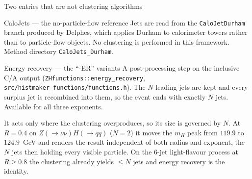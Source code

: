 \documentclass[aspectratio=169,10pt]{beamer}
\newcommand{\Ccalo}[1]{\textcolor{calogreen}{#1}}
\begin{document}
\begin{frame}{Two entries that are not clustering algorithms}

  \begin{block}{CaloJets --- the no-particle-flow reference}
    Jets are read from the \texttt{CaloJetDurham} branch produced by Delphes,
    which applies Durham to calorimeter towers rather than to particle-flow
    objects. No clustering is performed in this framework. Method directory
    \Ccalo{\texttt{CaloJets\_Durham}}.
  \end{block}

  \begin{block}{Energy recovery --- the ``-ER'' variants}
    A post-processing step on the inclusive C/A output
    (\texttt{ZHfunctions::energy\_recovery},
    \texttt{src/histmaker\_functions/functions.h}). The $N$ leading jets are
    kept and every surplus jet is recombined into them, so the event ends with
    exactly $N$ jets. Available for all three exponents.

    \smallskip
    It acts only where the clustering overproduces, so its size is governed by
    $N$. At $R = 0.4$ on $Z(\to\nu\nu)H(\to qq)$ ($N = 2$) it moves the $m_H$
    peak from $119.9$ to $124.9$~GeV and renders the result independent of both
    radius and exponent, the $N$ jets then holding every visible particle. On
    the 6-jet light-flavour process at $R \ge 0.8$ the clustering already yields
    $\le N$ jets and energy recovery is the identity.
  \end{block}
\end{frame}
\end{document}

